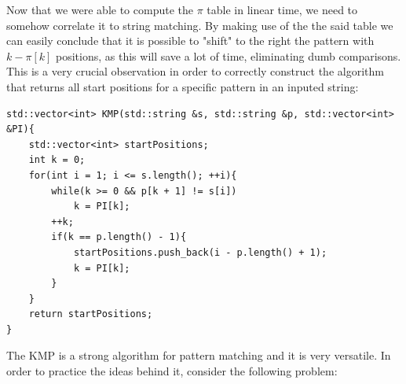 \documentclass[letterpaper]{article}
\begin{document}

Now that we were able to compute the $\pi$ table in linear time, we need to somehow correlate it to string matching. By making use of the the said table we can easily conclude that it is possible to "shift" to the right the pattern with $k - \pi [k]$ positions, as this will save a lot of time, eliminating dumb comparisons. This is a very crucial observation in order to correctly construct the algorithm that returns all start positions for a specific pattern in an inputed string: 

\begin{lstlisting}
std::vector<int> KMP(std::string &s, std::string &p, std::vector<int> &PI){
    std::vector<int> startPositions;
    int k = 0;
    for(int i = 1; i <= s.length(); ++i){
        while(k >= 0 && p[k + 1] != s[i])
            k = PI[k];
        ++k;
        if(k == p.length() - 1){
            startPositions.push_back(i - p.length() + 1);
            k = PI[k];
        }
    }
    return startPositions;
}
\end{lstlisting}


The KMP is a strong algorithm for pattern matching and it is very versatile. In order to practice the ideas behind it, consider the following problem:
\end{document}
